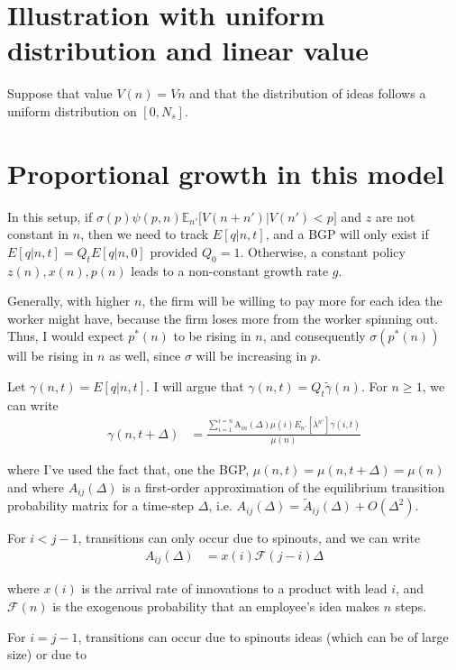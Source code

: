 \documentclass[12pt,english]{article}
\theoremstyle{remark}
\begin{document}
\section{Illustration with uniform distribution and linear value}

Suppose that value $V(n) = Vn$ and that the distribution of ideas follows a uniform distribution on $[0,N_s]$. 

\section{Proportional growth in this model}

In this setup, if $\sigma(p) \psi(p,n) \mathbb{E}_{n'} \Big[ V(n + n') | V(n') < p\Big]$ and $z$ are not constant in $n$, then we need to track $E[q | n , t]$, and a BGP will only exist if $E[q | n , t] = Q_t E[q | n, 0]$ provided $Q_0 = 1$. Otherwise, a constant policy $z(n), x(n), p(n)$ leads to a non-constant growth rate $g$. 

Generally, with higher $n$, the firm will be willing to pay more for each idea the worker might have, because the firm loses more from the worker spinning out. Thus, I would expect $p^*(n)$ to be rising in $n$, and consequently $\sigma(p^*(n))$ will be rising in $n$ as well, since $\sigma$ will be increasing in $p$. 

Let $\gamma(n,t) = E[q| n,t]$. I will argue that $\gamma(n,t) = Q_t \tilde{\gamma} (n)$. For $n \ge 1$, we can write 
\begin{align*}
	\gamma(n,t+\Delta) &= \frac{\sum_{i=1}^{i=n} \mathrm{A}_{in} (\Delta)\mu(i) E_{n'}[ \lambda^{n'} ] \gamma(i,t)}{\mu(n) }
\end{align*}

where I've used the fact that, one the BGP, $\mu(n,t) = \mu(n,t+\Delta) = \mu(n)$ and where $A_{ij}(\Delta)$ is a first-order approximation of the equilibrium transition probability matrix for a time-step $\Delta$, i.e. $A_{ij}(\Delta) = \tilde{A}_{ij}(\Delta) + O(\Delta^2)$.

For $i < j - 1$, transitions can only occur due to spinouts, and we can write
\begin{align*}
	A_{ij}(\Delta) &= x(i)  \mathcal{F}(j-i) \Delta
\end{align*}

where $x(i)$ is the arrival rate of innovations to a product with lead $i$, and $\mathcal{F}(n)$ is the exogenous probability that an employee's idea makes $n$ steps. 

For $i = j -1$, transitions can occur due to spinouts ideas (which can be of large size) or due to 
\end{document}
